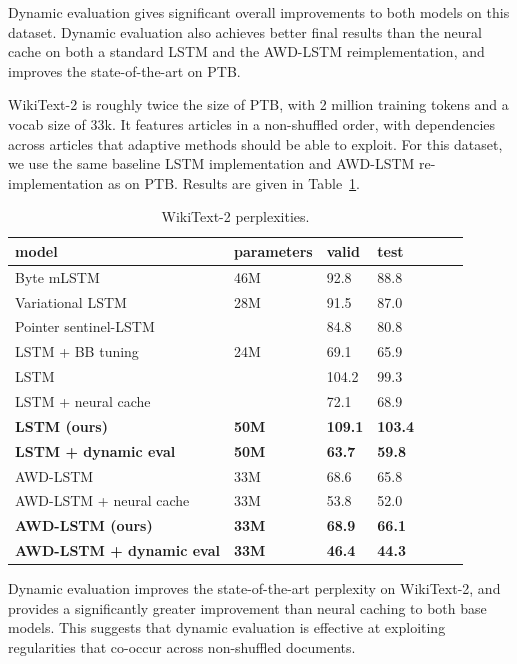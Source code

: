\documentclass{article} %
\begin{document}
Dynamic evaluation gives significant overall improvements to both models on this dataset. Dynamic evaluation also achieves better final results than the neural cache on both a standard LSTM and the AWD-LSTM reimplementation, and improves the state-of-the-art on PTB\@. 

WikiText-2 is roughly twice the size of PTB, with 2 million training tokens and a vocab size of 33k. It features articles in a non-shuffled order, with dependencies across articles that adaptive methods should be able to exploit. For this dataset, we use the same baseline LSTM implementation and AWD-LSTM re-implementation as on PTB\@. Results are given in Table~\ref{tab:wikitext}.

\begin{table}[tb]
\begin{center} 
\begin{tabular}{  l  l  l  l  l  l  l } \toprule 
model &  parameters & valid & test  \\ 
\midrule 
Byte mLSTM \citep{krause2016} & 46M &92.8 & 88.8 \\
Variational LSTM \citep{inan2017} & 28M &91.5 & 87.0 \\
Pointer sentinel-LSTM \citep{Merity2016} & & 84.8 & 80.8 \\
LSTM + BB tuning \citep{melis2017}& 24M & 69.1 & 65.9 \\
\midrule 
LSTM   \citep{grave2017} & & 104.2 & 99.3 \\
LSTM + neural cache \citep{grave2017}& & 72.1 & 68.9 \\
\textbf{LSTM (ours)} &\textbf{50M} & \textbf{109.1} & \textbf{103.4}  \\
\textbf{LSTM + dynamic eval}&\textbf{50M}  &  \textbf{63.7} & \textbf{59.8}\\
\midrule 
AWD-LSTM  \citep{merity2017}& 33M  & 68.6 & 65.8 \\
AWD-LSTM  + neural cache \citep{merity2017}& 33M & 53.8 & 52.0 \\
\textbf{AWD-LSTM (ours)}& \textbf{33M} & \textbf{68.9} &  \textbf{66.1} \\
\textbf{AWD-LSTM + dynamic eval}& \textbf{33M}  & \textbf{46.4} & \textbf{44.3} \\
\bottomrule
\end{tabular} 
\end{center}
\caption{WikiText-2 perplexities.}
\label{tab:wikitext}
\end{table}

Dynamic evaluation improves the state-of-the-art perplexity on WikiText-2, and provides a significantly greater improvement than neural caching to both base models. This suggests that dynamic evaluation is effective at exploiting regularities that co-occur across non-shuffled documents.
\end{document}
